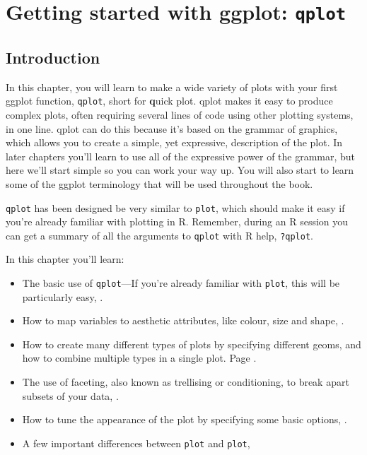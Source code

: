 

% 

%


\chapter{Getting started with ggplot: {\tt qplot}}
\label{cha:qplot}

\section{Introduction} 

In this chapter, you will learn to make a wide variety of plots with your first ggplot function, {\tt qplot}, short for {\bf q}uick plot. qplot makes it easy to produce complex plots, often requiring several lines of code using other plotting systems, in one line. qplot can do this because it's based on the grammar of graphics, which allows you to create a simple, yet expressive, description of the plot.  In later chapters you'll learn to use all of the expressive power of the grammar, but here we'll start simple so you can work your way up.  You will also start to learn some of the ggplot terminology that will be used throughout the book.

{\tt qplot} has been designed be very similar to {\tt plot}, which should make it easy if you're already familiar with plotting in R.  Remember, during an R session you can get a summary of all the arguments to {\tt qplot} with R help, {\tt ?qplot}.

In this chapter you'll learn:

\begin{itemize}
	\item The basic use of {\tt qplot}---If you're already familiar with {\tt plot}, this will be particularly easy, .
	\item How to map variables to aesthetic attributes, like colour, size and shape, .
	\item How to create many different types of plots by specifying different geoms, and how to combine multiple types in a single plot. Page .
	\item The use of faceting, also known as trellising or conditioning, to break apart subsets of your data, .
	\item How to tune the appearance of the plot by specifying some basic options, .
	\item A few important differences between {\tt plot} and {\tt plot}, 
\end{itemize}


